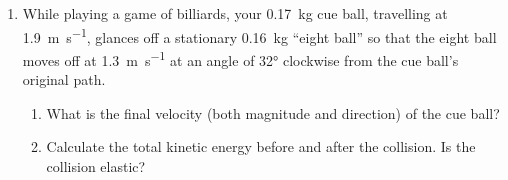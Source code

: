 \begin{enumerate}[itemsep=6pt]
\item While playing a game of billiards, your \SI{.17}{\kilo\gram} cue ball,
  travelling at \SI{1.9}{\metre\per\second}, glances off a stationary
  \SI{.16}{\kilo\gram} ``eight ball'' so that the eight ball moves off at
  \SI{1.3}{\metre\per\second} at an angle of \ang{32} clockwise from the cue
  ball's original path.
  \begin{enumerate}[itemsep=3pt]
  \item What is the final velocity (both magnitude and direction) of the cue
    ball?
  \item Calculate the total kinetic energy before and after the collision. Is
    the collision elastic?
  \end{enumerate}

\end{enumerate}


